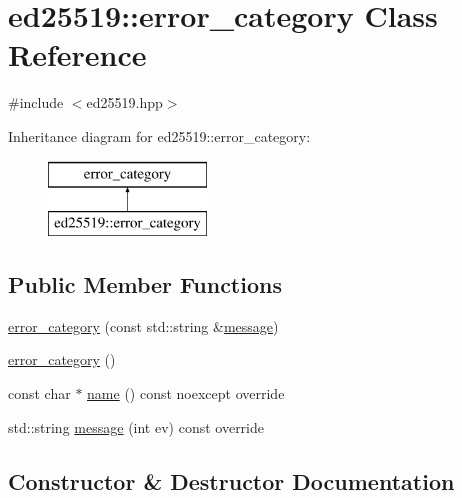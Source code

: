 \hypertarget{classed25519_1_1error__category}{}\section{ed25519\+::error\+\_\+category Class Reference}
\label{classed25519_1_1error__category}


{\ttfamily \#include $<$ed25519.\+hpp$>$}

Inheritance diagram for ed25519\+::error\+\_\+category\+:\begin{figure}[H]
\begin{center}
\leavevmode
\includegraphics[height=2.000000cm]{classed25519_1_1error__category}
\end{center}
\end{figure}
\subsection*{Public Member Functions}
\begin{DoxyCompactItemize}
\item 
\mbox{\hyperlink{classed25519_1_1error__category_a6150d658628877349385868102b0b9af}{error\+\_\+category}} (const std\+::string \&\mbox{\hyperlink{classed25519_1_1error__category_a202bf6ba84147b563f630c8f52c723ef}{message}})
\item 
\mbox{\hyperlink{classed25519_1_1error__category_a4fe3061ad89abff2d326dacbae9cee7d}{error\+\_\+category}} ()
\item 
const char $\ast$ \mbox{\hyperlink{classed25519_1_1error__category_a4bdacefbd1473eea02c945905230b6ce}{name}} () const noexcept override
\item 
std\+::string \mbox{\hyperlink{classed25519_1_1error__category_a202bf6ba84147b563f630c8f52c723ef}{message}} (int ev) const override
\end{DoxyCompactItemize}


\subsection{Constructor \& Destructor Documentation}
\mbox{\label{classed25519_1_1error__category_a6150d658628877349385868102b0b9af}} 
